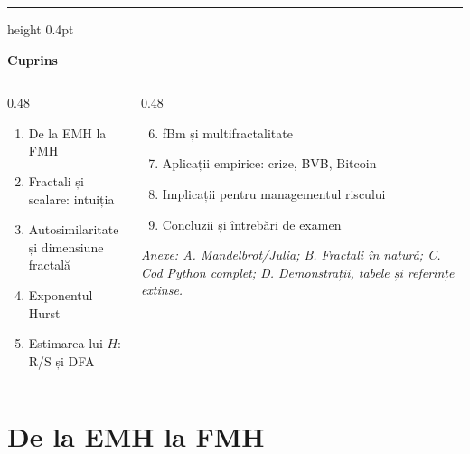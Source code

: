 \documentclass[9pt, aspectratio=169, t, handout]{beamer}
\theoremstyle{definition}
\begin{document}
{
\begin{frame}{}
    {\color{FooterGray}\hrule height 0.4pt}
    \vspace{0.1cm}
    {\Large\textcolor{IDAred}{\textbf{Cuprins}}}
    \vspace{0.2cm}
    {\small
    \begin{columns}[T]
        \begin{column}{0.48\textwidth}
            \begin{enumerate}
                \item De la EMH la FMH
                \item Fractali și scalare: intuiția
                \item Autosimilaritate și dimensiune fractală
                \item Exponentul Hurst
                \item Estimarea lui $H$: R/S și DFA
            \end{enumerate}
        \end{column}
        \begin{column}{0.48\textwidth}
            \begin{enumerate}\setcounter{enumi}{5}
                \item fBm și multifractalitate
                \item Aplicații empirice: crize, BVB, Bitcoin
                \item Implicații pentru managementul riscului
                \item Concluzii și întrebări de examen
            \end{enumerate}
            \vspace{0.15cm}
            {\scriptsize\textit{Anexe: A. Mandelbrot/Julia; B. Fractali în natură; C. Cod Python complet; D. Demonstrații, tabele și referințe extinse.}}
        \end{column}
    \end{columns}
    }
\end{frame}
}

\section{De la EMH la FMH}
\end{document}
